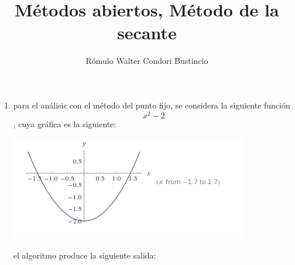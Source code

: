 \documentclass[10pt]{article}
\title{M\'etodos abiertos, M\'etodo de la secante}
\author{R\'omulo Walter Condori Bustincio}
\date{}
\begin{document}
\maketitle
\begin{enumerate}
\item para el an\'alisis con el m\'etodo del punto fijo, se considera la siguiente funci\'on $$x^2- 2$$, cuya gr\'afica es la siguiente:
\begin{center}
 \includegraphics[scale=0.8]{./grafica.jpg}
\end{center}
el algoritmo produce la siguiente salida:\\


\end{enumerate}
\end{document}
